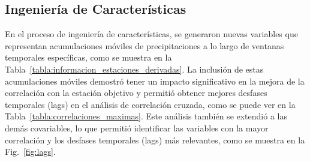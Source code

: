 \begin{table}[h]
  \caption{Información de las estaciones de medición}
  \label{tabla:informacion_estaciones}
  \centering
  \renewcommand{\arraystretch}{1.3}
  \setlength{\tabcolsep}{2pt}
\end{table}

\subsection{Ingeniería de Características}
En el proceso de ingeniería de características, se generaron nuevas variables que representan acumulaciones móviles de precipitaciones a lo largo de ventanas temporales específicas, como se muestra en la Tabla~\ref{tabla:informacion_estaciones_derivadas}.
La inclusión de estas acumulaciones móviles demostró tener un impacto significativo en la mejora de la correlación con la estación objetivo y permitió obtener mejores desfases temporales (lags) en el análisis de correlación cruzada, como se puede ver en la Tabla~\ref{tabla:correlaciones_maximas}. Este análisis también se extendió a las demás covariables, lo que permitió identificar las variables con la mayor correlación y los desfases temporales (lags) más relevantes, como se muestra en la Fig.~\ref{fig:lags}.

